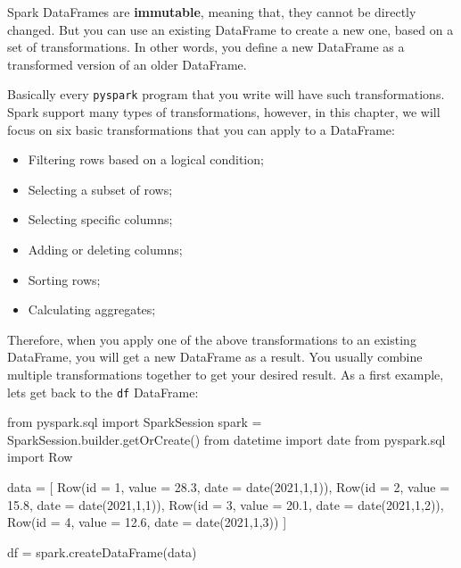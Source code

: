 \documentclass[
  11pt,
  letterpaper,
  DIV=11,
  numbers=noendperiod]{scrreprt}
\newenvironment{Shaded}{\begin{snugshade}}{\end{snugshade}}
\newcommand{\BuiltInTok}[1]{\textcolor[rgb]{0.00,0.23,0.31}{#1}}
\newcommand{\DecValTok}[1]{\textcolor[rgb]{0.68,0.00,0.00}{#1}}
\newcommand{\FloatTok}[1]{\textcolor[rgb]{0.68,0.00,0.00}{#1}}
\newcommand{\ImportTok}[1]{\textcolor[rgb]{0.00,0.46,0.62}{#1}}
\newcommand{\NormalTok}[1]{\textcolor[rgb]{0.00,0.23,0.31}{#1}}
\newcommand{\OperatorTok}[1]{\textcolor[rgb]{0.37,0.37,0.37}{#1}}
\providecommand{\tightlist}{%
  \setlength{\itemsep}{0pt}\setlength{\parskip}{0pt}}\usepackage{longtable,booktabs,array}
\begin{document}
Spark DataFrames are \textbf{immutable}, meaning that, they cannot be
directly changed. But you can use an existing DataFrame to create a new
one, based on a set of transformations. In other words, you define a new
DataFrame as a transformed version of an older DataFrame.

Basically every \texttt{pyspark} program that you write will have such
transformations. Spark support many types of transformations, however,
in this chapter, we will focus on six basic transformations that you can
apply to a DataFrame:

\begin{itemize}
\tightlist
\item
  Filtering rows based on a logical condition;
\item
  Selecting a subset of rows;
\item
  Selecting specific columns;
\item
  Adding or deleting columns;
\item
  Sorting rows;
\item
  Calculating aggregates;
\end{itemize}

Therefore, when you apply one of the above transformations to an
existing DataFrame, you will get a new DataFrame as a result. You
usually combine multiple transformations together to get your desired
result. As a first example, lets get back to the \texttt{df} DataFrame:

\begin{Shaded}
\begin{Highlighting}[]
\ImportTok{from}\NormalTok{ pyspark.sql }\ImportTok{import}\NormalTok{ SparkSession}
\NormalTok{spark }\OperatorTok{=}\NormalTok{ SparkSession.builder.getOrCreate()}
\ImportTok{from}\NormalTok{ datetime }\ImportTok{import}\NormalTok{ date}
\ImportTok{from}\NormalTok{ pyspark.sql }\ImportTok{import}\NormalTok{ Row}

\NormalTok{data }\OperatorTok{=}\NormalTok{ [}
\NormalTok{  Row(}\BuiltInTok{id} \OperatorTok{=} \DecValTok{1}\NormalTok{, value }\OperatorTok{=} \FloatTok{28.3}\NormalTok{, date }\OperatorTok{=}\NormalTok{ date(}\DecValTok{2021}\NormalTok{,}\DecValTok{1}\NormalTok{,}\DecValTok{1}\NormalTok{)),}
\NormalTok{  Row(}\BuiltInTok{id} \OperatorTok{=} \DecValTok{2}\NormalTok{, value }\OperatorTok{=} \FloatTok{15.8}\NormalTok{, date }\OperatorTok{=}\NormalTok{ date(}\DecValTok{2021}\NormalTok{,}\DecValTok{1}\NormalTok{,}\DecValTok{1}\NormalTok{)),}
\NormalTok{  Row(}\BuiltInTok{id} \OperatorTok{=} \DecValTok{3}\NormalTok{, value }\OperatorTok{=} \FloatTok{20.1}\NormalTok{, date }\OperatorTok{=}\NormalTok{ date(}\DecValTok{2021}\NormalTok{,}\DecValTok{1}\NormalTok{,}\DecValTok{2}\NormalTok{)),}
\NormalTok{  Row(}\BuiltInTok{id} \OperatorTok{=} \DecValTok{4}\NormalTok{, value }\OperatorTok{=} \FloatTok{12.6}\NormalTok{, date }\OperatorTok{=}\NormalTok{ date(}\DecValTok{2021}\NormalTok{,}\DecValTok{1}\NormalTok{,}\DecValTok{3}\NormalTok{))}
\NormalTok{]}

\NormalTok{df }\OperatorTok{=}\NormalTok{ spark.createDataFrame(data)}
\end{Highlighting}
\end{Shaded}
\end{document}
